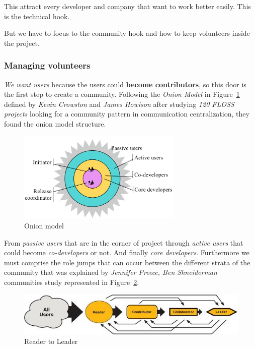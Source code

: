 \documentclass[11pt]{scrartcl}
\begin{document}
\par This attract every developer and company that want to work better easily. This is the technical hook.

\par But we have to focus to the community hook and how to keep volunteers inside the project.

\subsubsection{Managing volunteers}
\label{sub:volunteers-management}

\par \emph{We want users} because the users could \textbf{become contributors}, so this door is the first step to create a community. Following the \emph{Onion Model} in Figure~\ref{onion-model} defined by \emph{Kevin Crowston} and \emph{James Howison}\cite{social-structure-floss} after studying \emph{120 FLOSS projects} looking for a community pattern in communication centralization, they found the onion model structure.

\begin{figure}[H]
    \centering
    \includegraphics[width=0.7\textwidth]{onionstructure.png}
    \caption{Onion model}
    \label{onion-model}
\end{figure}

\par From \emph{passive users} that are in the corner of project through \emph{active users} that could become \emph{co-developers} or not. And finally \emph{core developers}. Furthermore we must comprise the role jumps that can occur between the different strata of the community that was explained by \emph{Jennifer Preece, Ben Shneiderman} communities study\cite{preece2009reader} represented in Figure~\ref{reader-to-leader}.

\begin{figure}[H]
    \centering
    \includegraphics[width=1\textwidth]{reader-to-leader.jpg}
    \caption{Reader to Leader}
    \label{reader-to-leader}
\end{figure}
\end{document}
